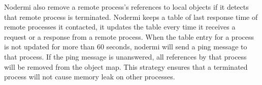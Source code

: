 Nodermi also remove a remote process's references to local objects if
it detects that remote process is terminated.
Nodermi keeps a table of last response time of remote processes it contacted,
it updates the table every time it receives a request or a response from a remote 
process. 
When the table entry for a process is not updated for more than 60 seconds, nodermi
will send a ping message to that process.
If the ping message is unanswered, all references by that process will be removed
from the object map.
This strategy ensures that a terminated process will not cause memory leak on
other processes.







